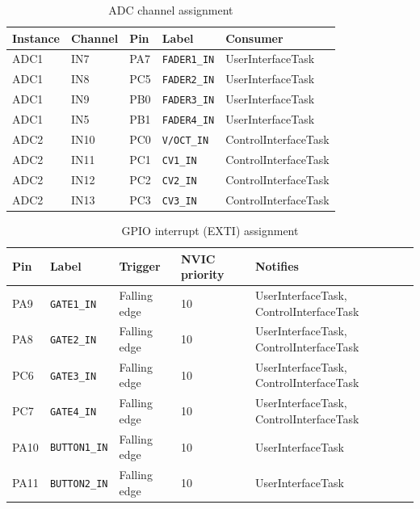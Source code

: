 \begin{table}[H]
	\centering
	\caption{ADC channel assignment}
	\label{tab:adc}
	\small
	\begin{tabular}{lllll}
		\toprule
		\textbf{Instance} & \textbf{Channel} & \textbf{Pin} & \textbf{Label} & \textbf{Consumer} \\
		\midrule
		ADC1 & IN7  & PA7 & \texttt{FADER1\_IN} & UserInterfaceTask \\
		ADC1 & IN8  & PC5 & \texttt{FADER2\_IN} & UserInterfaceTask \\
		ADC1 & IN9  & PB0 & \texttt{FADER3\_IN} & UserInterfaceTask \\
		ADC1 & IN5  & PB1 & \texttt{FADER4\_IN} & UserInterfaceTask \\
		\midrule
		ADC2 & IN10 & PC0 & \texttt{V/OCT\_IN}  & ControlInterfaceTask \\
		ADC2 & IN11 & PC1 & \texttt{CV1\_IN}    & ControlInterfaceTask \\
		ADC2 & IN12 & PC2 & \texttt{CV2\_IN}    & ControlInterfaceTask \\
		ADC2 & IN13 & PC3 & \texttt{CV3\_IN}    & ControlInterfaceTask \\
		\bottomrule
	\end{tabular}
\end{table}


\begin{table}[H]
	\centering
	\caption{GPIO interrupt (EXTI) assignment}
	\label{tab:exti}
	\small
	\begin{tabular}{lllll}
		\toprule
		\textbf{Pin} & \textbf{Label} & \textbf{Trigger} & \textbf{NVIC priority} & \textbf{Notifies} \\
		\midrule
		PA9  & \texttt{GATE1\_IN}   & Falling edge & 10 & UserInterfaceTask, ControlInterfaceTask \\
		PA8  & \texttt{GATE2\_IN}   & Falling edge & 10 & UserInterfaceTask, ControlInterfaceTask \\
		PC6  & \texttt{GATE3\_IN}   & Falling edge & 10 & UserInterfaceTask, ControlInterfaceTask \\
		PC7  & \texttt{GATE4\_IN}   & Falling edge & 10 & UserInterfaceTask, ControlInterfaceTask \\
		PA10 & \texttt{BUTTON1\_IN} & Falling edge & 10 & UserInterfaceTask \\
		PA11 & \texttt{BUTTON2\_IN} & Falling edge & 10 & UserInterfaceTask \\
		\bottomrule
	\end{tabular}
\end{table}


